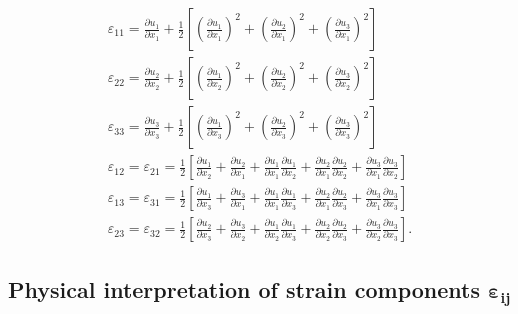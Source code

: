 \documentclass{AeroStructure-ERJohnson}
\begin{document}
\begin{gather}\label{eqA.20}
\varepsilon_{11}=\frac{\partial u_{1}}{\partial x_{1}}+\frac{1}{2}\left[\left(\frac{\partial u_{1}}{\partial x_{1}}\right)^{2}+\left(\frac{\partial u_{2}}{\partial x_{1}}\right)^{2}+\left(\frac{\partial u_{3}}{\partial x_{1}}\right)^{2}\right]\\
\label{eqA.21}\varepsilon_{22}=\frac{\partial u_{2}}{\partial x_{2}}+\frac{1}{2}\left[\left(\frac{\partial u_{1}}{\partial x_{2}}\right)^{2}+\left(\frac{\partial u_{2}}{\partial x_{2}}\right)^{2}+\left(\frac{\partial u_{3}}{\partial x_{2}}\right)^{2}\right]\\
\label{eqA.22}	\varepsilon_{33}=\frac{\partial u_{3}}{\partial x_{3}}+\frac{1}{2}\left[\left(\frac{\partial u_{1}}{\partial x_{3}}\right)^{2}+\left(\frac{\partial u_{2}}{\partial x_{3}}\right)^{2}+\left(\frac{\partial u_{3}}{\partial x_{3}}\right)^{2}\right]\\
\label{eqA.23}	\varepsilon_{12}=\varepsilon_{21}=\frac{1}{2}\left[\frac{\partial u_{1}}{\partial x_{2}}+\frac{\partial u_{2}}{\partial x_{1}}+\frac{\partial u_{1}}{\partial x_{1}} \frac{\partial u_{1}}{\partial x_{2}}+\frac{\partial u_{2}}{\partial x_{1}} \frac{\partial u_{2}}{\partial x_{2}}+\frac{\partial u_{3}}{\partial x_{1}} \frac{\partial u_{3}}{\partial x_{2}}\right]\\
\label{eqA.24}	\varepsilon_{13}=\varepsilon_{31}=\frac{1}{2}\left[\frac{\partial u_{1}}{\partial x_{3}}+\frac{\partial u_{3}}{\partial x_{1}}+\frac{\partial u_{1}}{\partial x_{1}} \frac{\partial u_{1}}{\partial x_{3}}+\frac{\partial u_{2}}{\partial x_{1}} \frac{\partial u_{2}}{\partial x_{3}}+\frac{\partial u_{3}}{\partial x_{1}} \frac{\partial u_{3}}{\partial x_{3}}\right]\\
\label{eqA.25}	\varepsilon_{23}=\varepsilon_{32}=\frac{1}{2}\left[\frac{\partial u_{2}}{\partial x_{3}}+\frac{\partial u_{3}}{\partial x_{2}}+\frac{\partial u_{1}}{\partial x_{2}} \frac{\partial u_{1}}{\partial x_{3}}+\frac{\partial u_{2}}{\partial x_{2}} \frac{\partial u_{2}}{\partial x_{3}}+\frac{\partial u_{3}}{\partial x_{2}} \frac{\partial u_{3}}{\partial x_{3}}\right].
\end{gather}

\subsection{Physical interpretation of strain components $\boldsymbol{\varepsilon}_{\boldsymbol{i j}}$}\label{secA.1.1}
\end{document}
